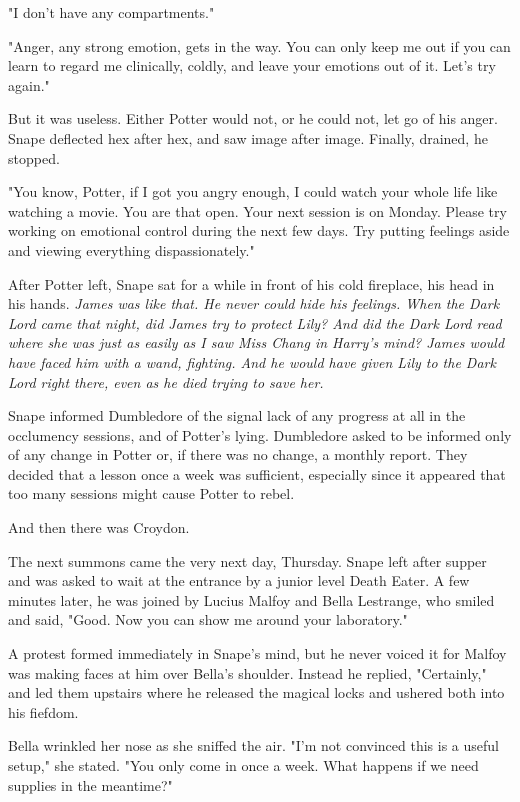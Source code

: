 "I don't have any compartments."

"Anger, any strong emotion, gets in the way. You can only keep me out if you can learn to regard me clinically, coldly, and leave your emotions out of it. Let's try again."

But it was useless. Either Potter would not, or he could not, let go of his anger. Snape deflected hex after hex, and saw image after image. Finally, drained, he stopped.

"You know, Potter, if I got you angry enough, I could watch your whole life like watching a movie. You are that open. Your next session is on Monday. Please try working on emotional control during the next few days. Try putting feelings aside and viewing everything dispassionately."

After Potter left, Snape sat for a while in front of his cold fireplace, his head in his hands. \emph{James was like that. He never could hide his feelings. When the Dark Lord came that night, did James try to protect Lily? And did the Dark Lord read where she was just as easily as I saw Miss Chang in Harry's mind? James would have faced him with a wand, fighting. And he would have given Lily to the Dark Lord right there, even as he died trying to save her.}

Snape informed Dumbledore of the signal lack of any progress at all in the occlumency sessions, and of Potter's lying. Dumbledore asked to be informed only of any change in Potter or, if there was no change, a monthly report. They decided that a lesson once a week was sufficient, especially since it appeared that too many sessions might cause Potter to rebel.

And then there was Croydon.

The next summons came the very next day, Thursday. Snape left after supper and was asked to wait at the entrance by a junior level Death Eater. A few minutes later, he was joined by Lucius Malfoy and Bella Lestrange, who smiled and said, "Good. Now you can show me around your laboratory."

A protest formed immediately in Snape's mind, but he never voiced it for Malfoy was making faces at him over Bella's shoulder. Instead he replied, "Certainly," and led them upstairs where he released the magical locks and ushered both into his fiefdom.

Bella wrinkled her nose as she sniffed the air. "I'm not convinced this is a useful setup," she stated. "You only come in once a week. What happens if we need supplies in the meantime?"

